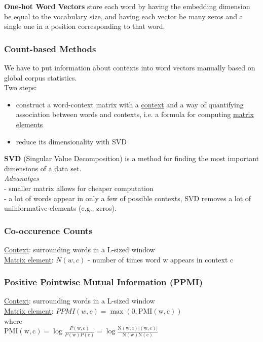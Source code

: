 \documentclass[8pt]{extarticle} %
\begin{document}
\begin{multicols*}{3}
\textbf{One-hot Word Vectors} store each word by having the embedding dimension be equal to the vocabulary size, and having each vector be many zeros and a single one in a position corresponding to that word.

\subsubsection*{Count-based Methods}
We have to put information about contexts into word vectors manually based on global corpus statistics.\\

Two steps: 
\begin{itemize}[label=\textbullet, labelsep=0.3em, leftmargin=0.5em, itemsep=0em]
    \item construct a word-context matrix with a \underline{context} and a way of quantifying association between words and contexts, i.e. a formula for computing \underline{matrix elements}
    \item reduce its dimensionality with SVD
\end{itemize}

\textbf{SVD} (Singular Value Decomposition) is a method for finding the most important dimensions of a data set.\\
\textit{Advanatges}\\
- smaller matrix allows for cheaper computation\\
- a lot of words appear in only a few of possible contexts, SVD removes a lot of uninformative elements (e.g., zeros).\\

\subsubsection*{Co-occurence Counts} 
\underline{Context}: surrounding words in a L-sized window\\
\underline{Matrix element}: $N(w, c)$ - number of times word w appears in context c\\

\subsubsection*{Positive Pointwise Mutual Information (PPMI)}
\underline{Context}: surrounding words in a L-sized window\\
\underline{Matrix element}: $PPMI(w, c)=\max (0, \mathrm{PMI}(\mathrm{w}, \mathrm{c}))$\\ where \\
$\mathrm{PMI}(\mathrm{w}, \mathrm{c})=\log \frac{P(\mathrm{w}, \mathrm{c})}{P(\mathrm{w}) P(\mathrm{c})}=\log \frac{\mathrm{N}(\mathrm{w}, \mathrm{c})|(\mathrm{w}, \mathrm{c})|}{\mathrm{N}(\mathrm{w}) \mathrm{N}(\mathrm{c})}$\\


\end{multicols*}
\end{document}
